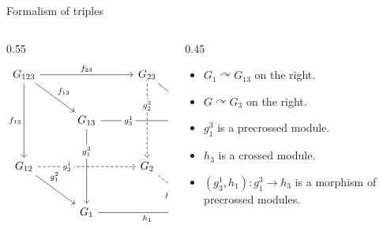 \documentclass[handout]{beamer} %
\theoremstyle{definition}
\begin{document}
\begin{frame}[fragile]{Formalism of triples}

\begin{columns}[T]

\begin{column}{0.55\textwidth}
\centering
\[
\begin{tikzcd}[row sep=2.6em, column sep=3em]
G_{123}
  \arrow[rr, "f_{23}"]
  \arrow[dd, "f_{12}"']
  \arrow[rd, "f_{13}"]
&&
G_{23}
  \arrow[dd, dashed, "{g_2^3}" description, pos=0.3]
  \arrow[rd, "{g_3^2}", pos=0.3]
& \\
&
G_{13}
  \arrow[rr, "{g_3^1}" description, pos=0.3]
  \arrow[dd, "{g_1^3}" description, pos=0.3]
&&
G_3
  \arrow[dd, "h_3"]
\\
G_{12}
  \arrow[rr, dashed, "{g_2^1}" description, pos=0.3]
  \arrow[rd, "{g_1^2}", pos=0.3]
&&
G_2
  \arrow[rd, dashed, "h_2"']
& \\
&
G_1
  \arrow[rr, "h_1"']
&&
G
\end{tikzcd}
\]
\end{column}

\begin{column}{0.45\textwidth}

\begin{itemize}
\item $G_1 \curvearrowright G_{13}$ on the right.
\pause
\item $G \curvearrowright G_3$ on the right.
\pause
\item $g_1^3$ is a precrossed module.
\pause
\item $h_3$ is a crossed module.
\pause
\item $(g_3^1,h_1)\colon g_1^3 \to h_3$ is a morphism of precrossed modules.
\end{itemize}

\end{column}

\end{columns}
\end{frame}
\end{document}
